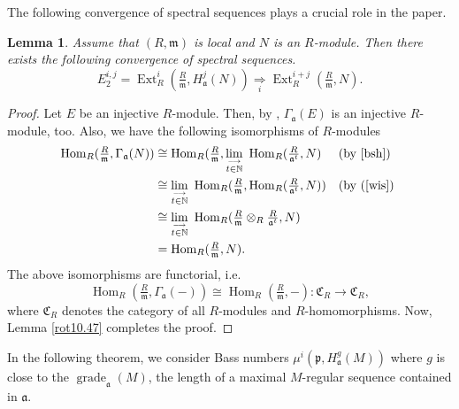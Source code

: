 \documentclass[12pt,twoside, final]{amsart}
\numberwithin{equation}{section}
\newtheorem{lem}[thm]{Lemma}
\newtheorem{nota rem}[thm]{Notation and Remark}
\newtheorem{defen rem}[thm]{Definition and Remark}
\def\Ext{\operatorname{Ext}}
\def\Hom{\operatorname{Hom}}
\def\grade{\operatorname{grade}}
\newcommand{\p}{\mathfrak{p}}
\newcommand{\fa}{\mathfrak{a}}
\newcommand{\m}{\mathfrak{m}}
\begin{document}
 The following convergence of spectral sequences plays a crucial role in the paper.
\begin{lem}\label{spec}
 Assume that  $(R, \m)$ is local and $N$ is an $R$-module. Then there exists the following   convergence of spectral sequences.
\begin{equation}\label{1}
     E_2^{i, j}= \Ext^i_{R }(\tfrac{R}{\m}, H^j_{\fa}(N))\underset{i}{\Rightarrow}\Ext^{i+ j}_{R}(\tfrac{R}{\m}, N).
\end{equation}
   
 \end{lem}
\begin{proof}
  
Let $E$ be an  injective $R$-module. Then, by \cite[Proposition  2. 1. 4]{bsh}, $\Gamma_{\fa}(E)$ is an  injective $R$-module, too.   
Also, we have the following  isomorphisms of   $R$-modules
\begin{align}\label{a}
\Hom_R(\tfrac{R}{\m}, \Gamma_{\fa}(N))&\cong \Hom_R(\tfrac{R}{\m},\underset{ \overset {\longrightarrow}{t\in \mathbb{N}}}{ \lim }\,\,   \Hom _{R}(\tfrac{R}{\fa^t}, N) && \text{(by \cite[Theorem 1. 3. 8]{bsh})} \\
&\cong \underset{ \overset {\longrightarrow}{t\in \mathbb{N}}}{ \lim }\,\,\Hom_R(\tfrac{R}{\m}, \Hom _{R}(\tfrac{R}{\fa^t}, N)) && \text{(by  (\cite[24. 10]{wis}) } \nonumber\\
&\cong \underset{ \overset {\longrightarrow}{t\in \mathbb{N}}}{ \lim }\,\, \Hom_R(\tfrac{R}{\m}\otimes_R \tfrac{R}{\fa^t}, N)  \nonumber\\
&=  \Hom_R(\tfrac{R}{\m}, N).\nonumber
\end{align}
The above isomorphisms are functorial, i.e.
\begin{equation}\label{wwww}
\Hom_R(\tfrac{R}{\m}, \Gamma_{\fa}(-))\cong  \Hom_{R}(\tfrac{R}{\m}, -): 
  \mathfrak{C} _R\rightarrow 
  \mathfrak{C}_R,
\end{equation}
where  $\mathfrak{C} _R$   denotes the category of all $R$-modules and   $R$-homomorphisms. Now, Lemma \ref{rot10.47} completes the proof.
 \end{proof}
In the following theorem, we consider Bass numbers $\mu^i(\p, H^g_{\fa}(M))$ where $g$ is close to the $\grade_{\fa}(M)$, the length of a maximal $M$-regular sequence contained in $\fa$. 
\end{document}
